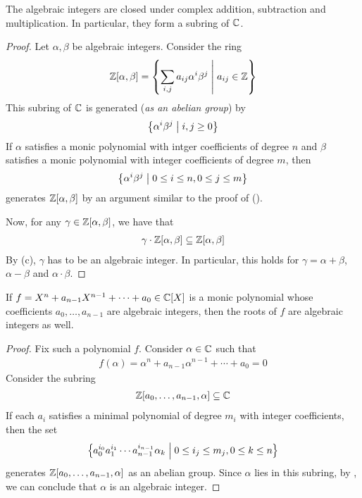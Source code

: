 \begin{boxproposition}
    The algebraic integers are closed under complex addition, subtraction and multiplication. In particular, they form a subring of $\mathbb{C}$.
\end{boxproposition}
\begin{proof}
    Let $\alpha, \beta$ be algebraic integers. Consider the ring
    \begin{align*}
        \mathbb{Z}\!\left[ \alpha, \beta \right] =
        \left\{ \sum_{i, j} a_{ij} \alpha^i \beta^j \; \middle\vert \; a_{ij} \in \mathbb{Z} \right\}
    \end{align*}
    This subring of $\mathbb{C}$ is generated (\emph{as an abelian group}) by
    \begin{align*}
        \left\{ \alpha^i \beta^j \; \middle\vert \; i, j \geq 0 \right\}
    \end{align*}
    If $\alpha$ satisfies a monic polynomial with intger coefficients of degree $n$ and $\beta$ satisfies a monic polynomial with integer coefficients of degree $m$, then
    \begin{align*}
        \left\{ \alpha^i \beta^j \; \middle\vert \; 0 \leq i \leq n, 0 \leq j \leq m \right\}
    \end{align*}
    generates $\mathbb{Z}\!\left[ \alpha, \beta \right]$ by an argument similar to the proof of  (\sorry).

    Now, for any $\gamma \in \mathbb{Z}\!\left[ \alpha, \beta \right]$, we have that
    \begin{align*}
        \gamma \cdot \mathbb{Z}\!\left[ \alpha, \beta \right] \subseteq \mathbb{Z}\!\left[ \alpha, \beta \right]
    \end{align*}
    By (c), $\gamma$ has to be an algebraic integer. In particular, this holds for $\gamma = \alpha + \beta$, $\alpha - \beta$ and $\alpha \cdot \beta$.
\end{proof}

\begin{boxproposition}
    If $f = X^n + a_{n-1}X^{n-1} + \cdots + a_0 \in \mathbb{C}[X]$ is a monic polynomial whose coefficients $a_{0}, \ldots, a_{n-1}$ are algebraic integers, then the roots of $f$ are algebraic integers as well.
\end{boxproposition}
\begin{proof}
    Fix such a polynomial $f$. Consider $\alpha \in \mathbb{C}$ such that
    \begin{align*}
        f(\alpha) = \alpha^n + a_{n-1} \alpha^{n-1} + \cdots + a_0 = 0
    \end{align*}
    Consider the subring
    \begin{align*}
        \mathbb{Z}\!\left[ a_0, \ldots, a_{n-1}, \alpha \right] \subseteq \mathbb{C}
    \end{align*}
    If each $a_i$ satisfies a minimal polynomial of degree $m_i$ with integer coefficients, then the set
    \begin{align*}
        \left\{ a_0^{i_0} a_1^{i_1} \cdots a_{n-1}^{i_{n-1}}\alpha_k \; \middle\vert \; 0 \leq i_j \leq m_j, 0 \leq k \leq n \right\}
    \end{align*}
    generates $\mathbb{Z}\!\left[ a_0, \ldots, a_{n-1}, \alpha \right]$ as an abelian group. Since $\alpha$ lies in this subring, by , we can conclude that $\alpha$ is an algebraic integer.
\end{proof}
